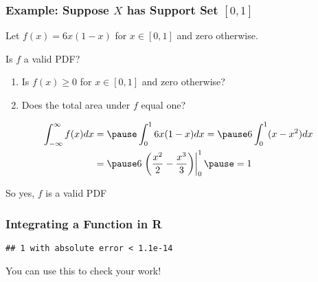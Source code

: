 \begin{frame}
  \frametitle{Example: Suppose $X$ has Support Set $[0,1]$}

  Let $f(x) = 6x(1-x)$ for $x \in [0,1]$ and zero otherwise.

\vspace{2em}

\begin{alertblock}{Is $f$ a valid PDF?}
  \begin{enumerate}
    \item Is $f(x) \geq 0$ for $x \in [0,1]$ and zero otherwise? 
    \item Does the total area under $f$ equal one?
  \end{enumerate}
  \begin{eqnarray*}
    \int_{-\infty}^{\infty} f(x)dx &= \pause \displaystyle \int_{0}^1 6x(1-x)dx = \pause 6\int_0^1 (x - x^2)dx\\
    &= \pause\displaystyle 6\left.\left( \frac{x^2}{2} - \frac{x^3}{3} \right)\right|_0^1 \pause = 1
  \end{eqnarray*}
\end{alertblock}

\hfill\alert{So yes, $f$ is a valid PDF \checkmark}



\end{frame}
\begin{frame}[fragile]
  \frametitle{Integrating a Function in R}
\begin{knitrout}
\color{fgcolor}\begin{kframe}
\begin{alltt}
 \hlkwb{<-} \hlstd{(}\hlstd{) \{}
   \hlopt{*}  \hlopt{*} \hlstd{(} \hlopt{-} 
\hlstd{\}}

  \hlstd{=} \hlstd{,}  \hlstd{=} \hlstd{)}
\end{alltt}
\begin{verbatim}
## 1 with absolute error < 1.1e-14
\end{verbatim}
\end{kframe}
\end{knitrout}

\hfill\alert{You can use this to check your work!}

\end{frame}
